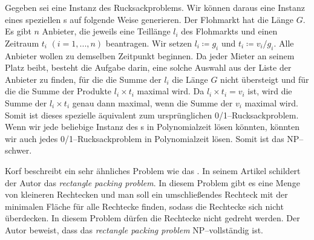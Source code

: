 Gegeben sei eine Instanz des Rucksackproblems.
Wir können daraus eine Instanz eines speziellen \fp s
auf folgende Weise generieren. Der Flohmarkt hat die Länge $G$.
Es gibt $n$ Anbieter, die jeweils eine Teillänge $l_i$ des Flohmarkts 
und einen Zeitraum $t_i$ $(i=1,...,n)$ beantragen. 
Wir setzen $l_i\coloneqq g_i$ und $t_i\coloneqq v_i/g_i$.
Alle Anbieter wollen zu demselben Zeitpunkt beginnen. 
Da jeder Mieter an seinem Platz beibt, besteht die Aufgabe darin,
eine solche Auswahl aus der Liste der Anbieter zu finden,
für die die Summe der $l_i$ die Länge $G$ nicht übersteigt und
für die die Summe der Produkte $l_i\times t_i$ maximal wird.
Da $l_i \times t_i = v_i$ ist,
wird die Summe der $l_i\times t_i$ genau dann maximal,
wenn die Summe der $v_i$ maximal wird.
Somit ist dieses spezielle \fp{} äquivalent zum ursprünglichen 0/1--Rucksackproblem.
Wenn wir jede beliebige Instanz des \fp s in Polynomialzeit lösen könnten,
könnten wir auch jedes 0/1--Rucksackproblem in Polynomialzeit lösen.
Somit ist das \fp{} NP--schwer.


Korf beschreibt ein sehr ähnliches Problem wie das \fp.\cite{korf} 
In seinem Artikel schildert der Autor das \textit{rectangle packing problem}.
In diesem Problem gibt es eine Menge von kleineren Rechtecken und man soll
ein umschließendes Rechteck mit der minimalen Fläche für alle Rechtecke finden,
sodass die Rechtecke sich nicht überdecken.
In diesem Problem dürfen die Rechtecke nicht gedreht werden.
Der Autor beweist, dass das \textit{rectangle packing problem} NP--vollständig ist.

